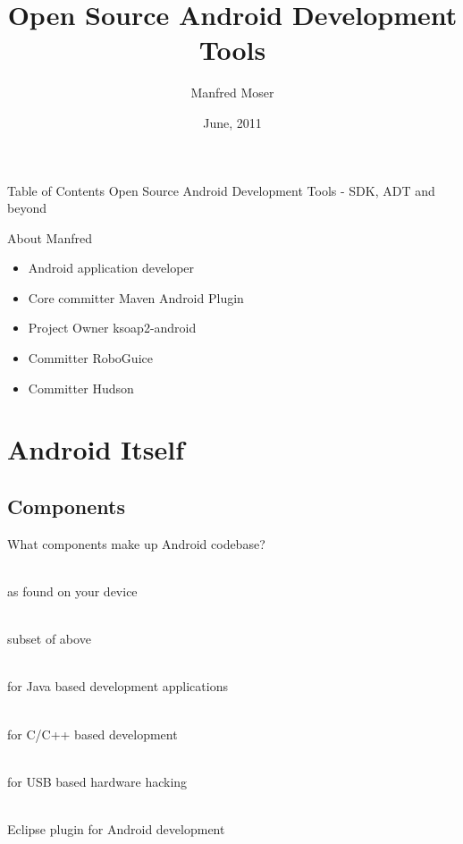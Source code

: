 \documentclass[aspectratio=169]{beamer}
\title{Open Source Android Development Tools}
\author{Manfred Moser}
\date{June, 2011}
\institute{simpligility technologies inc.}
\begin{document}
\begin{frame}
  \titlepage
\end{frame}

\begin{frame}{Table of Contents}
  Open Source Android Development Tools - SDK, ADT and beyond
  \setcounter{tocdepth}{1}
  \tableofcontents
\end{frame}

\begin{frame}{About Manfred}
  \begin{itemize}
    \item<1-> Android application developer
    \item<2-> Core committer Maven Android Plugin
    \item<3-> Project Owner ksoap2-android
    \item<4-> Committer RoboGuice
    \item<5-> Committer Hudson
  \end{itemize}

\end{frame}


\section{Android Itself}

  \subsection{Components}
    \begin{frame}{What components make up Android codebase?}
      \begin{description}
        \item<1->[Android Proper] \hfill \\ as found on your device
        \item<2->[Android Open Source Project AOSP] \hfill  \\ subset of above 
        \item<3->[Android Software Development Kit SDK] \hfill  \\ for Java based development applications
        \item<4->[Android Native Development Kit NDK] \hfill  \\ for C/C++ based development
        \item<5->[Android Open Accessory Development Kit ADK] \hfill \\ for USB based hardware hacking
        \item<6->[Android Development Toolkit ADT] \hfill  \\ Eclipse plugin for Android development  
      \end{description}
    \end{frame}
\end{document}
